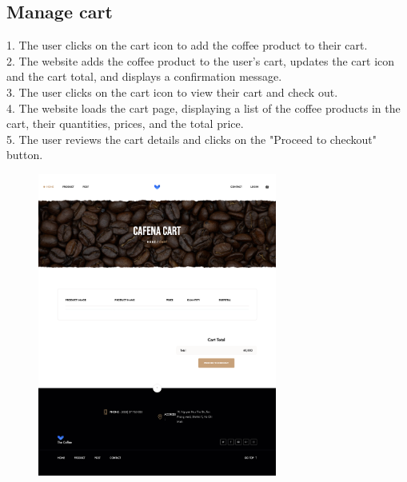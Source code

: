 \subsection{Manage cart}
1. The user clicks on the cart icon to add the coffee product to their cart. \\
2. The website adds the coffee product to the user's cart, updates the cart icon and the cart total, and displays a confirmation message. \\
3. The user clicks on the cart icon to view their cart and check out. \\
4. The website loads the cart page, displaying a list of the coffee products in the cart, their quantities, prices, and the total price. \\
5. The user reviews the cart details and clicks on the "Proceed to checkout" button.
\begin{figure}[H]
    \centering
    \includegraphics[width=0.7\textwidth]{Demo/Cart.png}
    \label{fig:cartpage}
\end{figure}
